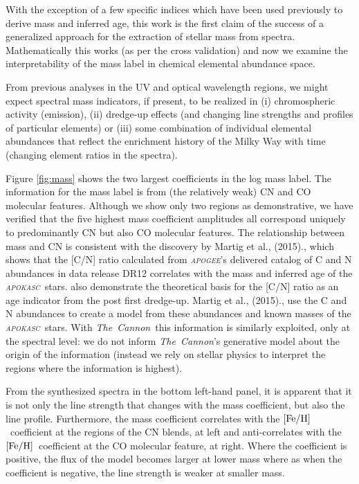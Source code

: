 \documentclass[12pt, preprint]{aastex}
\newcommand{\project}[1]{\textsl{#1}}
\newcommand{\tc}{\project{The~Cannon}}
\newcommand{\apogee}{\project{\textsc{apogee}}}
\newcommand{\apokasc}{\project{\textsc{apokasc}}}
\newcommand{\feh}{\mbox{$\rm [Fe/H]$}}
\begin{document}
With the exception of a few specific indices which have been used previously to derive mass and inferred age, this work is the first claim of the success of a generalized approach for the extraction of stellar mass from spectra.  Mathematically this works (as per the cross validation) and now we examine the interpretability of the mass label in chemical elemental abundance space. 

From previous analyses in the UV and optical wavelength regions, we might expect spectral mass indicators, if present, to be realized in (i) chromospheric activity (emission), (ii) dredge-up effects (and changing line strengths and profiles of particular elements) or (iii) some combination of individual elemental abundances that reflect the enrichment history of the Milky Way with time (changing element ratios in the spectra). 

Figure \ref{fig:mass} shows the two largest coefficients in the log mass label. The information for the mass label is from (the relatively weak) CN and CO molecular features. Although we show only two regions as demonstrative, we have verified that the five highest mass coefficient amplitudes all correspond uniquely to predominantly CN but also CO molecular features. The relationship between mass and CN is consistent with the discovery by Martig et al., (2015)., which shows that the [C/N] ratio calculated from \apogee's delivered catalog of C and N abundances in data release DR12 correlates with the mass and inferred age of the \apokasc\ stars. \citet{Sal2015} also demonstrate the theoretical basis for the [C/N] ratio as an age indicator from the post first dredge-up. Martig et al., (2015)., use the C and N abundances to create a model from these abundances and known masses of the \apokasc\ stars. With \tc\, this information is similarly exploited, only at the spectral level: we do not inform \tc's generative model about the origin of the information (instead we rely on stellar physics to interpret the regions where the information is highest). 

From the synthesized spectra in the bottom left-hand panel, it is apparent that it is not only the line strength that changes with the mass coefficient, but also the line profile. Furthermore, the mass coefficient correlates with the \feh\ coefficient at the regions of the CN blends, at left and anti-correlates with the \feh\ coefficient at the CO molecular feature, at right. Where the coefficient is positive, the flux of the model becomes larger at lower mass where as when the coefficient is negative, the line strength is weaker at smaller mass.  
\end{document}
